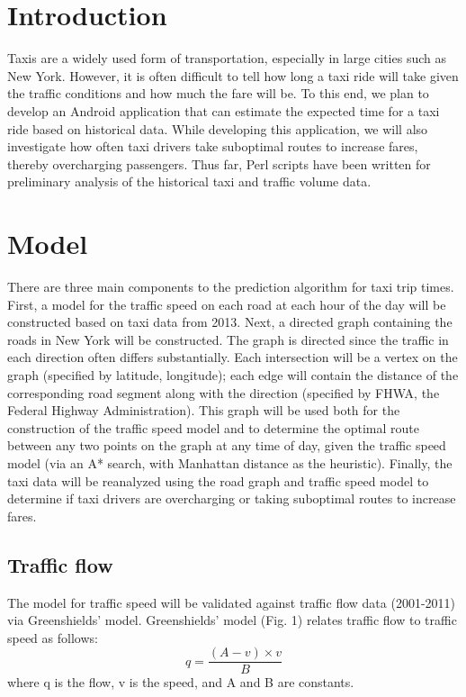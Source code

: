 \documentclass{sig-alternate}
\begin{document}


\section{Introduction}
Taxis are a widely used form of transportation, especially in large cities such as New York. However, it is often difficult to tell how long a taxi ride will take given the traffic conditions and how much the fare will be. To this end, we plan to develop an Android application that can estimate the expected time for a taxi ride based on historical data. While developing this application, we will also investigate how often taxi drivers take suboptimal routes to increase fares, thereby overcharging passengers. Thus far, Perl scripts have been written for preliminary analysis of the historical taxi and traffic volume data.

\section{Model}
There are three main components to the prediction algorithm for taxi trip times. First, a model for the traffic speed on each road at each hour of the day will be constructed based on taxi data from 2013. Next, a directed graph containing the roads in New York will be constructed. The graph is directed since the traffic in each direction often differs substantially. Each intersection will be a vertex on the graph (specified by latitude, longitude); each edge will contain the distance of the corresponding road segment along with the direction (specified by FHWA, the Federal Highway Administration). This graph will be used both for the construction of the traffic speed model and to determine the optimal route between any two points on the graph at any time of day, given the traffic speed model (via an A* search, with Manhattan distance as the heuristic). Finally, the taxi data will be reanalyzed using the road graph and traffic speed model to determine if taxi drivers are overcharging or taking suboptimal routes to increase fares.

\subsection{Traffic flow}
The model for traffic speed will be validated against traffic flow data (2001-2011) via Greenshields' model\cite{green}. Greenshields' model (Fig. 1) relates traffic flow to traffic speed as follows:
\begin{equation}q=\frac{(A-v)\times v}{B}\end{equation}
where q is the flow, v is the speed, and A and B are constants.
\end{document}
